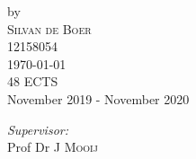 \begin{titlepage}
    
    
    
    by\\[0.2cm]
    
    \textsc{\Large Silvan de Boer}\\[0.2cm] %
    
    12158054\\[1cm]
    
    
    
    
    
    
    
    
    
    
    {\Large \today}\\[1cm] %
    
    
    
    48 ECTS\\ %
    
    November 2019 - November 2020\\[1cm]%
    
    
    
    
    
    
    
    \begin{minipage}[t]{0.4\textwidth}

    \begin{flushleft} \large
    
    \emph{Supervisor:} \\
    
    Prof Dr J \textsc{Mooij} %
    
    \end{flushleft}
    
    \end{minipage}%
    \begin{minipage}[t]{0.4\textwidth}
    

\end{minipage}
\end{titlepage}
